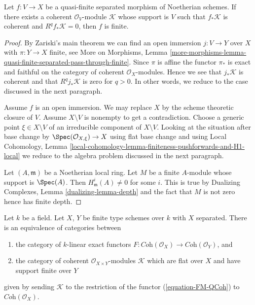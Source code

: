\begin{lemma}
\label{lemma-characterize-finite}
Let $f : V \to X$ be a quasi-finite separated morphism of Noetherian
schemes. If there exists a coherent $\mathcal{O}_V$-module $\mathcal{K}$
whose support is $V$ such that $f_*\mathcal{K}$ is coherent and
$R^qf_*\mathcal{K} = 0$, then $f$ is finite.
\end{lemma}

\begin{proof}
By Zariski's main theorem we can find an open immersion
$j : V \to Y$ over $X$ with $\pi : Y \to X$ finite, see
More on Morphisms, Lemma
\ref{more-morphisms-lemma-quasi-finite-separated-pass-through-finite}.
Since $\pi$ is affine the functor $\pi_*$ is exact and faithful
on the category of coherent $\mathcal{O}_X$-modules.
Hence we see that $j_*\mathcal{K}$ is coherent and
that $R^qj_*\mathcal{K}$ is zero for $q > 0$.
In other words, we reduce to the case discussed in the next paragraph.

\medskip\noindent
Assume $f$ is an open immersion. We may replace $X$ by the
scheme theoretic closure of $V$. Assume $X \setminus V$ is nonempty
to get a contradiction. Choose a generic point $\xi \in X \setminus V$
of an irreducible component of $X \setminus V$. Looking at the situation
after base change by $\Spec(\mathcal{O}_{X, \xi}) \to X$ using flat base
change and using
Local Cohomology, Lemma
\ref{local-cohomology-lemma-finiteness-pushforwards-and-H1-local}
we reduce to the algebra problem discussed in the next paragraph.

\medskip\noindent
Let $(A, \mathfrak m)$ be a Noetherian local ring. Let $M$ be a finite
$A$-module whose support is $\Spec(A)$. Then $H^i_\mathfrak m(A) \not = 0$
for some $i$. This is true by
Dualizing Complexes, Lemma \ref{dualizing-lemma-depth}
and the fact that $M$ is not zero hence has finite depth.
\end{proof}

\begin{lemma}
\label{lemma-functor-coherent-over-field}
Let $k$ be a field. Let $X$, $Y$ be finite type schemes over $k$ with
$X$ separated. There is an equivalence of categories between
\begin{enumerate}
\item the category of $k$-linear exact functors
$F : \textit{Coh}(\mathcal{O}_X) \to \textit{Coh}(\mathcal{O}_Y)$, and
\item the category of coherent $\mathcal{O}_{X \times Y}$-modules
$\mathcal{K}$ which are flat over $X$ and have support finite over $Y$
\end{enumerate}
given by sending $\mathcal{K}$ to the restriction of the functor
(\ref{equation-FM-QCoh}) to $\textit{Coh}(\mathcal{O}_X)$.
\end{lemma}

